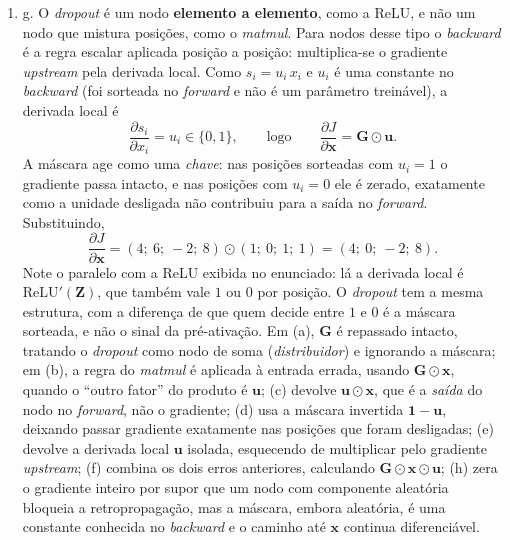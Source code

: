 \documentclass{dlproblemset}
\begin{document}
\begin{enumerate}[1)]
\begin{enumerate}[a)]
\begin{itemize}
            \item Nodo \textit{matmul} da camada 1: $\frac{\partial J}{\partial \mathbf{\Theta}^{(1)}} = {\boldsymbol{\delta}^{(1)}}^{\top}\mathbf{X} = \begin{bmatrix} -0.0161 \\ 0.0102 \end{bmatrix}\begin{bmatrix} 1 & 2 \end{bmatrix} = \begin{bmatrix} -0.0161 & -0.0322 \\ 0.0102 & 0.0204 \end{bmatrix}$.
        \end{itemize}
        $\mathbf{X}$ e $y$ são dados do problema, então não recebem gradiente.
    \end{enumerate}

    \item g. O \textit{dropout} é um nodo \textbf{elemento a elemento}, como a ReLU, e não um nodo que mistura posições, como o \textit{matmul}. Para nodos desse tipo o \textit{backward} é a regra escalar aplicada posição a posição: multiplica-se o gradiente \textit{upstream} pela derivada local. Como $s_i = u_i\,x_i$ e $u_i$ é uma constante no \textit{backward} (foi sorteada no \textit{forward} e não é um parâmetro treinável), a derivada local é
    \[
    \frac{\partial s_i}{\partial x_i} = u_i \in \{0, 1\},
    \qquad\text{logo}\qquad
    \frac{\partial J}{\partial \mathbf{x}} = \mathbf{G} \odot \mathbf{u}.
    \]
    A máscara age como uma \emph{chave}: nas posições sorteadas com $u_i = 1$ o gradiente passa intacto, e nas posições com $u_i = 0$ ele é zerado, exatamente como a unidade desligada não contribuiu para a saída no \textit{forward}. Substituindo,
    \[
    \frac{\partial J}{\partial \mathbf{x}} = (4;\ 6;\ -2;\ 8) \odot (1;\ 0;\ 1;\ 1) = (4;\ 0;\ -2;\ 8).
    \]
    Note o paralelo com a ReLU exibida no enunciado: lá a derivada local é $\mathrm{ReLU}'(\mathbf{Z})$, que também vale $1$ ou $0$ por posição. O \textit{dropout} tem a mesma estrutura, com a diferença de que quem decide entre $1$ e $0$ é a máscara sorteada, e não o sinal da pré-ativação. Em (a), $\mathbf{G}$ é repassado intacto, tratando o \textit{dropout} como nodo de soma (\textit{distribuidor}) e ignorando a máscara; em (b), a regra do \textit{matmul} é aplicada à entrada errada, usando $\mathbf{G} \odot \mathbf{x}$, quando o ``outro fator'' do produto é $\mathbf{u}$; (c) devolve $\mathbf{u} \odot \mathbf{x}$, que é a \emph{saída} do nodo no \textit{forward}, não o gradiente; (d) usa a máscara invertida $\mathbf{1} - \mathbf{u}$, deixando passar gradiente exatamente nas posições que foram desligadas; (e) devolve a derivada local $\mathbf{u}$ isolada, esquecendo de multiplicar pelo gradiente \textit{upstream}; (f) combina os dois erros anteriores, calculando $\mathbf{G} \odot \mathbf{x} \odot \mathbf{u}$; (h) zera o gradiente inteiro por supor que um nodo com componente aleatória bloqueia a retropropagação, mas a máscara, embora aleatória, é uma constante conhecida no \textit{backward} e o caminho até $\mathbf{x}$ continua diferenciável.


\end{enumerate}
\end{document}
